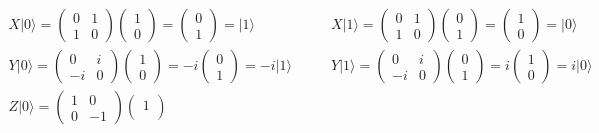 \begin{align*}
	X\vert 0 \rangle = 
	\begin{pmatrix}
		0	&	1\\
		1	&	0
	\end{pmatrix}
	\begin{pmatrix}
		1\\
		0
	\end{pmatrix} = 
	\begin{pmatrix}
		0\\
		1
	\end{pmatrix}
	= \vert 1 \rangle \quad & \quad X\vert 1 \rangle = 
	\begin{pmatrix}
		0	&	1\\
		1	&	0
	\end{pmatrix}\begin{pmatrix}
		0\\
		1
	\end{pmatrix} = 
	\begin{pmatrix}
		1\\
		0
	\end{pmatrix}
	= \vert 0 \rangle\\
	Y\vert 0 \rangle = 
	\begin{pmatrix}
		0	&	i\\
		-i	&	0
	\end{pmatrix}
	\begin{pmatrix}
		1\\
		0
	\end{pmatrix} = -i 
	\begin{pmatrix}
		0\\
		1
	\end{pmatrix}
	=  -i\vert 1 \rangle \quad & \quad Y\vert 1 \rangle = 
	\begin{pmatrix}
		0	&	i\\
		-i	&	0
	\end{pmatrix}
	\begin{pmatrix}
		0\\
		1
	\end{pmatrix} = i 
	\begin{pmatrix}
		1\\
		0
	\end{pmatrix}
	= 
	i\vert 0  \rangle\\
	Z\vert 0 \rangle = 
	\begin{pmatrix}
		1	&	0\\
		0	&	-1
	\end{pmatrix}
	\begin{pmatrix}
		1\\

\end{pmatrix}
\end{align*}
